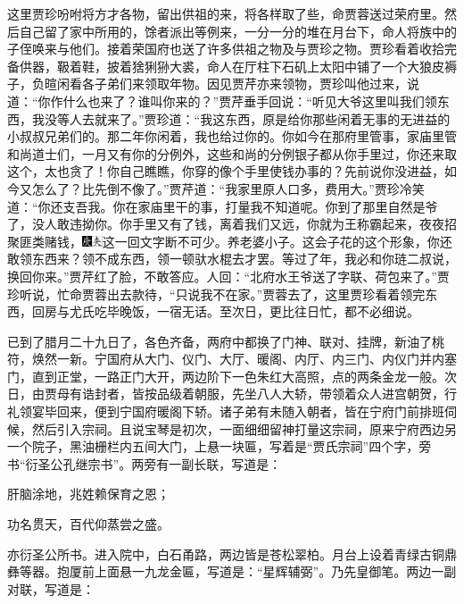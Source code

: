 这里贾珍吩咐将方才各物，留出供祖的来，将各样取了些，命贾蓉送过荣府里。然后自己留了家中所用的，馀者派出等例来，一分一分的堆在月台下，命人将族中的子侄唤来与他们。接着荣国府也送了许多供祖之物及与贾珍之物。贾珍看着收拾完备供器，靸着鞋，披着猞猁狲大裘，命人在厅柱下石矶上太阳中铺了一个大狼皮褥子，负暄闲看各子弟们来领取年物。因见贾芹亦来领物，贾珍叫他过来，说道：``你作什么也来了？谁叫你来的？''贾芹垂手回说：``听见大爷这里叫我们领东西，我没等人去就来了。''贾珍道：``我这东西，原是给你那些闲着无事的无进益的小叔叔兄弟们的。那二年你闲着，我也给过你的。你如今在那府里管事，家庙里管和尚道士们，一月又有你的分例外，这些和尚的分例银子都从你手里过，你还来取这个，太也贪了！你自己瞧瞧，你穿的像个手里使钱办事的？先前说你没进益，如今又怎么了？比先倒不像了。''贾芹道：``我家里原人口多，费用大。''贾珍冷笑道：``你还支吾我。你在家庙里干的事，打量我不知道呢。你到了那里自然是爷了，没人敢违拗你。你手里又有了钱，离着我们又远，你就为王称霸起来，夜夜招聚匪类赌钱，{\includegraphics[width=3mm]{../Images/00004}\includegraphics[width=3mm]{../Images/00012}\footnotesize \kaishu 这一回文字断不可少。}养老婆小子。这会子花的这个形象，你还敢领东西来？领不成东西，领一顿驮水棍去才罢。等过了年，我必和你琏二叔说，换回你来。''贾芹红了脸，不敢答应。人回：``北府水王爷送了字联、荷包来了。''贾珍听说，忙命贾蓉出去款待，``只说我不在家。''贾蓉去了，这里贾珍看着领完东西，回房与尤氏吃毕晚饭，一宿无话。至次日，更比往日忙，都不必细说。

已到了腊月二十九日了，各色齐备，两府中都换了门神、联对、挂牌，新油了桃符，焕然一新。宁国府从大门、仪门、大厅、暖阁、内厅、内三门、内仪门并内塞门，直到正堂，一路正门大开，两边阶下一色朱红大高照，点的两条金龙一般。次日，由贾母有诰封者，皆按品级着朝服，先坐八人大轿，带领着众人进宫朝贺，行礼领宴毕回来，便到宁国府暖阁下轿。诸子弟有未随入朝者，皆在宁府门前排班伺候，然后引入宗祠。且说宝琴是初次，一面细细留神打量这宗祠，原来宁府西边另一个院子，黑油栅栏内五间大门，上悬一块匾，写着是``贾氏宗祠''四个字，旁书``衍圣公孔继宗书''。两旁有一副长联，写道是：

肝脑涂地，兆姓赖保育之恩；

功名贯天，百代仰蒸尝之盛。

亦衍圣公所书。进入院中，白石甬路，两边皆是苍松翠柏。月台上设着青绿古铜鼎彝等器。抱厦前上面悬一九龙金匾，写道是：``星辉辅弼''。乃先皇御笔。两边一副对联，写道是：

